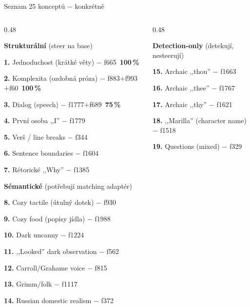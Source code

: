 \documentclass[aspectratio=169,10pt]{beamer}
\begin{document}
\begin{frame}[t]{Seznam 25 konceptů $-$ konkrétně}
  \vspace{1mm}
  \begin{columns}[T,onlytextwidth]
    \begin{column}{0.48\textwidth}
      {\footnotesize
      {\color{accGreen}\textbf{Strukturální} (steer na base)}\par\vspace{0.5mm}
      \textbf{1.} Jednoduchost (krátké věty) $-$ f665 \textbf{\,100\,\%}\par
      \textbf{2.} Komplexita (ozdobná próza) $-$ f883$+$f993$+$f60 \textbf{\,100\,\%}\par
      \textbf{3.} Dialog (speech) $-$ f1777$+$f689 \textbf{\,75\,\%}\par
      \textbf{4.} První osoba ,,I'' $-$ f1779\par
      \textbf{5.} Verš / line breaks $-$ f344\par
      \textbf{6.} Sentence boundaries $-$ f1604\par
      \textbf{7.} Rétorické ,,Why'' $-$ f1385\par\vspace{2.5mm}

      {\color{accOrange}\textbf{Sémantické} (potřebují matching adaptér)}\par\vspace{0.5mm}
      \textbf{8.} Cozy tactile (útulný dotek) $-$ f930\par
      \textbf{9.} Cozy food (popisy jídla) $-$ f1988\par
      \textbf{10.} Dark uncanny $-$ f1224\par
      \textbf{11.} ,,Looked'' dark observation $-$ f562\par
      \textbf{12.} Carroll/Grahame voice $-$ f815\par
      \textbf{13.} Grimm/folk $-$ f1117\par
      \textbf{14.} Russian domestic realism $-$ f372\par
      }
    \end{column}
    \begin{column}{0.48\textwidth}
      {\footnotesize
      {\color{accRed}\textbf{Detection-only} (detekují, nesteerují)}\par\vspace{0.5mm}
      \textbf{15.} Archaic ,,thou'' $-$ f1663\par
      \textbf{16.} Archaic ,,thee'' $-$ f1767\par
      \textbf{17.} Archaic ,,thy'' $-$ f1621\par
      \textbf{18.} ,,Marilla'' (character name) $-$ f1518\par
      \textbf{19.} Questions (mixed) $-$ f329\par\vspace{2.5mm}

}
\end{column}
\end{columns}
\end{frame}
\end{document}
